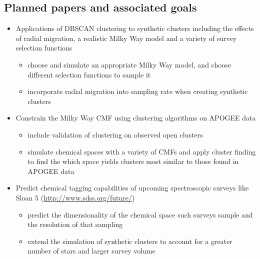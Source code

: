 \documentclass[11pt]{article}
\begin{document}
\subsection*{Planned papers and associated goals}
\begin{itemize}
	\item Applications of DBSCAN clustering to synthetic clusters including the effects of radial migration, a realistic Milky Way model and a variety of survey selection functions
	\begin{itemize}
	\item choose and simulate an appropriate Milky Way model, and choose different selection functions to sample it
	\item incorporate radial migration into sampling rate when creating synthetic clusters
	\end{itemize}
	\item Constrain the Milky Way CMF using clustering algorithms on APOGEE data
	\begin{itemize}
	\item include validation of clustering on observed open clusters
	\item simulate chemical spaces with a variety of CMFs and apply cluster finding to find the which space yields clusters most similar to those found in APOGEE data
	\end{itemize}
	\item Predict chemical tagging capabilities of upcoming spectroscopic surveys like Sloan 5 (\url{http://www.sdss.org/future/})
	\begin{itemize}
	\item predict the dimensionality of the chemical space such surveys sample and the resolution of that sampling
	\item extend the simulation of synthetic clusters to account for a greater number of stars and larger survey volume
	\end{itemize}
\end{itemize}

\end{document}
